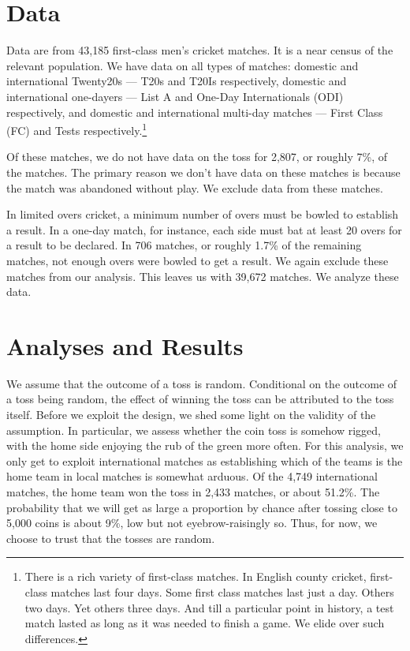 \documentclass[12pt]{article}
\begin{document}
\section*{Data}
Data are from 43,185 first-class men's cricket matches. It is a near census of the relevant population. We have data on all types of matches: domestic and international Twenty20s --- T20s and T20Is respectively, domestic and international one-dayers --- List A and One-Day Internationals (ODI) respectively, and domestic and international multi-day matches --- First Class (FC) and Tests respectively.\footnote{There is a rich variety of first-class matches. In English county cricket, first-class matches last four days. Some first class matches last just a day. Others two days. Yet others three days. And till a particular point in history, a test match lasted as long as it was needed to finish a game. We elide over such differences.} 

Of these matches, we do not have data on the toss for 2,807, or roughly 7\%, of the matches. The primary reason we don't have data on these matches is because the match was abandoned without play. We exclude data from these matches. 

In limited overs cricket, a minimum number of overs must be bowled to establish a result. In a one-day match, for instance, each side must bat at least 20 overs for a result to be declared. In 706 matches, or roughly 1.7\% of the remaining matches, not enough overs were bowled to get a result. We again exclude these matches from our analysis. This leaves us with 39,672 matches. We analyze these data.
 
\section*{Analyses and Results}

We assume that the outcome of a toss is random. Conditional on the outcome of a toss being random, the effect of winning the toss can be attributed to the toss itself. Before we exploit the design, we shed some light on the validity of the assumption. In particular, we assess whether the coin toss is somehow rigged, with the home side enjoying the rub of the green more often. For this analysis, we only get to exploit international matches as establishing which of the teams is the home team in local matches is somewhat arduous. Of the 4,749 international matches, the home team won the toss in 2,433 matches, or about 51.2\%. The probability that we will get as large a proportion by chance after tossing close to 5,000 coins is about 9\%, low but not eyebrow-raisingly so. Thus, for now, we choose to trust that the tosses are random.
\end{document}
